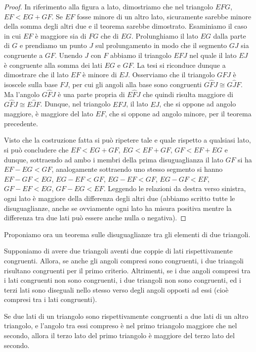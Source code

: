 \begin{proof}
In riferimento alla figura a lato, dimostriamo che nel triangolo $EFG$, $EF < EG + GF$. Se $EF$ fosse minore di un altro lato, sicuramente sarebbe minore della somma degli altri due e il teorema sarebbe dimostrato. Esaminiamo il caso in cui $EF$ è maggiore sia di $FG$ che di $EG$. Prolunghiamo il lato $EG$ dalla parte di $G$ e prendiamo un punto $J$ sul prolungamento in modo che il segmento $GJ$ sia congruente a $GF$. Unendo $J$ con $F$ abbiamo il triangolo $EFJ$ nel quale il lato $EJ$ è congruente alla somma dei lati $EG$ e $GF$. La tesi si riconduce dunque a dimostrare che il lato $EF$ è minore di $EJ$. Osserviamo che il triangolo $GFJ$ è isoscele sulla base $FJ$, per cui gli angoli alla base sono congruenti $G\widehat{F}J\cong G\widehat{J}F$. Ma l'angolo $G\widehat{F}J$ è una parte propria di $E\widehat{F}J$ che quindi risulta maggiore di $G\widehat{F}J\cong E\widehat{J}F$. Dunque, nel triangolo $EFJ$, il lato $EJ$, che si oppone ad angolo maggiore, è maggiore del lato $EF$, che si oppone ad angolo minore, per il teorema precedente.
 
Visto che la costruzione fatta si può ripetere tale e quale rispetto a qualsiasi lato, si può concludere che $EF<EG+GF$, $EG<EF+GF$, $GF<EF+EG$ e dunque, sottraendo ad ambo i membri della prima disuguaglianza il lato $GF$ si ha $EF-EG<GF$, analogamente sottraendo uno stesso segmento si hanno $EF-GF<EG$, $EG-EF<GF$, $EG-EF<GF$, $EG-GF<EF$, $GF-EF<EG$, $GF-EG<EF$. Leggendo le relazioni da destra verso sinistra, ogni lato è maggiore della differenza degli altri due (abbiamo scritto tutte le disuguaglianze, anche se ovviamente ogni lato ha misura positiva mentre la differenza tra due lati può essere anche nulla o negativa).
\end{proof}

Proponiamo ora un teorema sulle disuguaglianze tra gli elementi di due triangoli.

Supponiamo di avere due triangoli aventi due coppie di lati rispettivamente congruenti. Allora, se anche gli angoli compresi sono congruenti, i due triangoli risultano congruenti per il primo criterio. Altrimenti, se i due angoli compresi tra i lati congruenti non sono congruenti, i due triangoli non sono congruenti, ed i terzi lati sono diseguali nello stesso verso degli angoli opposti ad essi (cioè compresi tra i lati congruenti).

\begin{teorema}
Se due lati di un triangolo sono rispettivamente congruenti a due lati di un altro triangolo, e l'angolo tra essi compreso è nel primo triangolo maggiore che nel secondo, allora il terzo lato del primo triangolo è maggiore del terzo lato del secondo.
\end{teorema}

